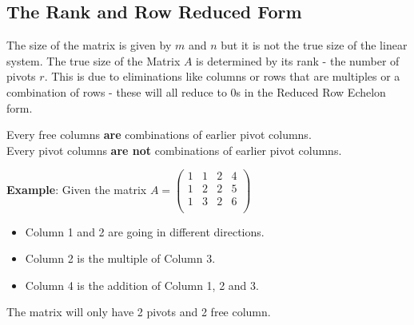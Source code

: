 \documentclass[10pt,a4paper]{article}
\begin{document}
\subsection{The Rank and Row Reduced Form}
The size of the matrix is given by $m$ and $n$ but it is not the true size of the linear system. The
true size of the Matrix $A$ is determined by its rank - the number of pivots $r$. This is due to
eliminations like columns or rows that are multiples or a combination of rows - these will all
reduce to 0s in the Reduced Row Echelon form. \par
\begin{tcolorbox}[breakable,colback=white,colframe=black,width=\dimexpr\textwidth+12mm\relax,enlarge left by=-6mm]
Every free columns \textbf{are} combinations of earlier pivot columns. \\
Every pivot columns \textbf{are not} combinations of earlier pivot columns. 
\end{tcolorbox}
\textbf{Example}: Given the matrix $A=\left (\begin{matrix}
	1 & 1 & 2 & 4\\ 
	1 & 2 & 2 & 5\\ 
	1 & 3 & 2 & 6\\ 
   \end{matrix}  \right )$
   \begin{itemize}
	   \item Column 1 and 2 are going in different directions.
	   \item Column 2 is the multiple of Column 3.
	   \item Column 4 is the addition of Column 1, 2 and 3.
   \end{itemize}
   The matrix will only have 2 pivots and 2 free column.
\end{document}

